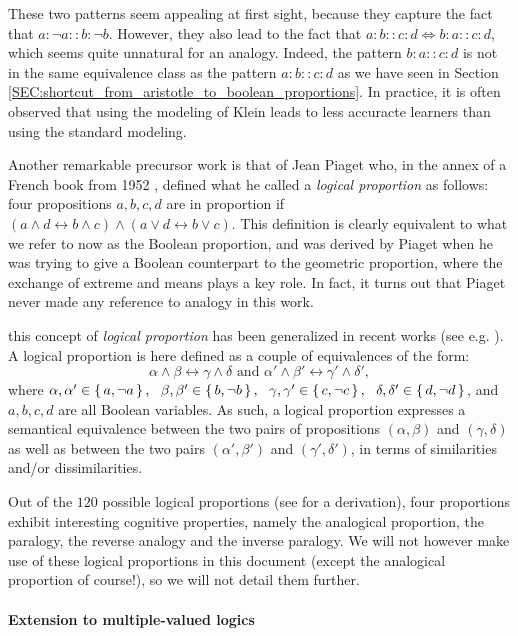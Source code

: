 These two patterns seem appealing at first sight, because they capture the fact
that $a : \neg a :: b : \neg b$. However, they also lead to the fact that
$a:b::c:d \iff b : a :: c :d$, which seems quite unnatural for an analogy.
Indeed, the pattern $b:a::c:d$ is not in the same equivalence class as the
pattern $a:b::c:d$ as we have seen in Section
\ref{SEC:shortcut_from_aristotle_to_boolean_proportions}. In practice, it is
often observed that using the modeling of Klein leads to less accuracte
learners than using the standard modeling.

Another remarkable precursor work is that of Jean Piaget who, in the annex of a
French book from 1952 \cite{Pia52}, defined what he called a \textit{logical
proportion} as follows: four propositions $a, b, c,d$ are in proportion if $(a
\wedge d \leftrightarrow b \wedge c) \wedge (a \vee  d \leftrightarrow b \vee
c)$. This definition is clearly equivalent to what we refer to now as the
Boolean proportion, and was derived by Piaget when he was trying to give a
Boolean counterpart to the geometric proportion, where the exchange of extreme
and means plays a key role. In fact, it turns out that Piaget never made any
reference to analogy in this work.

this concept of \textit{logical proportion} has been generalized in recent
works (see e.g. \cite{PraRic14}). A logical proportion is here defined as a
couple of equivalences of the form:
$$\alpha \wedge \beta \leftrightarrow  \gamma \wedge \delta \text{ and }
\alpha' \wedge \beta' \leftrightarrow  \gamma' \wedge \delta',$$
where $\alpha, \alpha' \in \set{a, \neg a}, ~~ \beta, \beta' \in \set{b, \neg
b}, ~~ \gamma, \gamma' \in \set{c, \neg c}, ~~\delta, \delta' \in \set{d, \neg
d}$, and $a, b, c, d$ are all Boolean variables. As such, a logical proportion
expresses a semantical equivalence between the two pairs of propositions
$(\alpha, \beta)$ and $(\gamma, \delta)$ as well as between the two pairs
$(\alpha', \beta')$ and $(\gamma', \delta')$, in terms of similarities and/or
dissimilarities.

Out of the $120$ possible logical proportions (see \cite{PraRic12} for a
derivation), four proportions exhibit interesting cognitive properties, namely
the analogical proportion, the paralogy, the reverse analogy and the inverse
paralogy. We will not however make use of these logical proportions in this
document (except the analogical proportion of course!), so we will not detail
them further.

\paragraph{Extension to multiple-valued logics\\}

